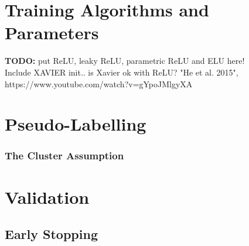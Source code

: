 	\section {Training Algorithms and Parameters}
	\label{act_funcs}
	\textbf{TODO:} put ReLU, leaky ReLU, parametric ReLU and ELU here!\\ Include XAVIER init.. is Xavier ok with ReLU? "He et al. 2015", https://www.youtube.com/watch?v=gYpoJMlgyXA


	\section {Pseudo-Labelling}

		\subsubsection {The Cluster Assumption}

	\section {Validation}
		
		\subsection{Early Stopping}